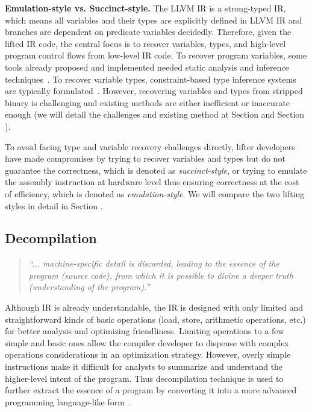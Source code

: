 \noindent \textbf{Emulation-style vs. Succinct-style.} The LLVM IR is a
strong-typed IR, which means all variables and their types are explicitly
defined in LLVM IR and branches are dependent on predicate variables
decidedly. Therefore, given the lifted IR code, the central focus is to
recover variables, types, and high-level program control flows from low-level
IR code. To recover program variables, some tools already proposed and
implemented needed static analysis and inference
techniques~\cite{anand2013compiler,balakrishnan2010wysinwyx,balakrishnan2007divine,reps2008improved,elwazeer2013scalable}.
To recover variable types, constraint-based type inference systems are
typically formulated~\cite{lee2011tie,noonan2016polymorphic}. However,
recovering variables and types from stripped binary is challenging and
existing methods are either inefficient or inaccurate enough (we will detail
the challenges and existing method at Section  and Section ).

To avoid facing type and variable recovery challenges directly, lifter
developers have made compromises by trying to recover variables and types but
do not guarantee the correctness, which is denoted as \textit{succinct-style},
or trying to emulate the assembly instruction at hardware level thus ensuring
correctness at the cost of efficiency, which is denoted as \textit{emulation-style}.
We will compare the two lifting styles in detail in Section .

\subsection{Decompilation} \label{sec:background-decompilation}

\begin{quote}
\textit{``... machine-specific detail is discarded, leading to the essence of
the program (source code), from which it is possible to divine a deeper truth
(understanding of the program).''}~\cite{van2007static}
\end{quote}

Although IR is already understandable, the IR is designed with only limited
and straightforward kinds of basic operations (load, store, arithmetic
operations, etc.) for better analysis and optimizing friendliness. Limiting
operations to a few simple and basic ones allow the compiler developer to
dispense with complex operations considerations in an optimization strategy.
However, overly simple instructions make it difficult for analysts to
summarize and understand the higher-level intent of the program. Thus
decompilation technique is used to further extract the essence of a program by
converting it into a more advanced programming language-like
form~\cite{van2007static,fokin2010reconstruction,engel2011enhanced,brumley2013native}.

